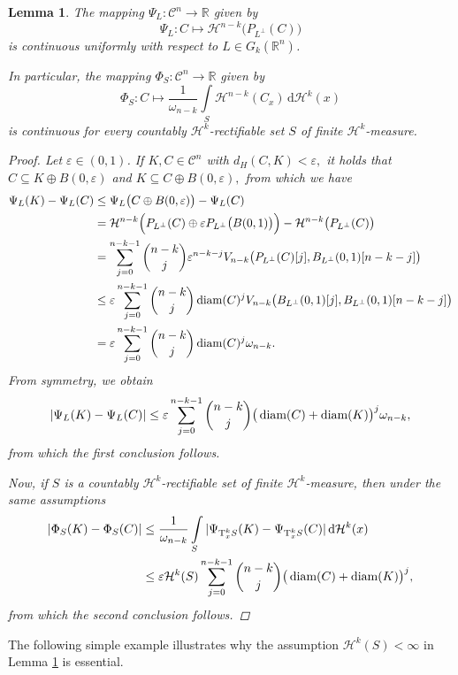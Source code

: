 \documentclass[pdflatex,sn-mathphys-num]{sn-jnl}
\theoremstyle{plain}
\newtheorem{lemma}[theorem]{Lemma}
\theoremstyle{definition}
\DeclareMathOperator{\diam}{\textup{diam}}
\newcommand{\dH}[1]{\,\mathrm d\mathcal{H}^{#1}}
\begin{document}
\begin{lemma}\label{continuity}
    The mapping $\Psi_{L}\colon \mathcal{C}^n\to\mathbb{R}$ given by $$\Psi_{L}\colon C\mapsto \mathcal{H}^{n-k}\big(P_{L^{\perp}}(C)\big)$$ is continuous uniformly with respect to $L\in G_k(\mathbb{R}^n)$. 
    
    In particular, the mapping $\Phi_S\colon \mathcal{C}^n\to\mathbb{R}$ given by $$\Phi_S\colon C\mapsto \frac{1}{\omega_{n-k}}\int\limits_{S}\mathcal{H}^{n-k}(C_x)\dH{k}(x)$$ is continuous for every countably $\mathcal{H}^k$-rectifiable set $S$ of finite $\mathcal{H}^k$-measure.
    \begin{proof}
        Let $\varepsilon\in(0, 1)$. If $K, C\in\mathcal{C}^n$ with $d_H(C, K)<\varepsilon,$ it holds that $C\subseteq K\oplus B(0, \varepsilon)$ and $K\subseteq C\oplus B(0, \varepsilon), $ from which we have \begin{equation*}
            \begin{split}
                \Psi_{L}(K)-\Psi_{L}(C)&\leq\Psi_{L}\big(C\oplus B(0, \varepsilon)\big)-\Psi_{L}(C)\\&=\mathcal{H}^{n-k}\Big(P_{L^{\perp}}(C)\oplus \varepsilon P_{L^{\perp}}\big(B(0, 1)\big)\Big)-\mathcal{H}^{n-k}\big(P_{L^{\perp}}(C)\big)\\&=\sum_{j=0}^{n-k-1}{n-k\choose j}\varepsilon^{n-k-j} V_{n-k}\big(P_{L^{\perp}}(C)[j], B_{L^{\perp}}(0, 1)[n-k-j]\big)\\&\leq\varepsilon\sum_{j=0}^{n-k-1}{n-k\choose j}\diam(C)^j V_{n-k}\big(B_{L^{\perp}}(0, 1)[j], B_{L^{\perp}}(0, 1)[n-k-j]\big)\\&=\varepsilon\sum_{j=0}^{n-k-1}{n-k\choose j}\diam(C)^j \omega_{n-k}.
            \end{split}
        \end{equation*}
        From symmetry, we obtain \begin{equation*}
            \begin{split}
                |\Psi_{L}(K)-\Psi_{L}(C)|\leq\varepsilon\sum_{j=0}^{n-k-1}{n-k\choose j}\big(\diam(C)+\diam(K)\big)^j \omega_{n-k},
            \end{split}
        \end{equation*}from which the first conclusion follows.

        Now, if $S$ is a countably $\mathcal{H}^k$-rectifiable set of finite $\mathcal{H}^k$-measure, then under the same assumptions  \begin{equation*}
            \begin{split}
                \left|\Phi_S(K)-\Phi_S(C)\right|&\leq\frac{1}{\omega_{n-k}}\int\limits_{S}|\Psi_{\textup{T}^k_xS}(K)-\Psi_{\textup{T}^k_xS}(C)|\dH{k}(x)\\&\leq \varepsilon\mathcal{H}^k(S)\sum_{j=0}^{n-k-1}{n-k\choose j}\big(\diam(C)+\diam(K)\big)^j,
            \end{split}
        \end{equation*} from which the second conclusion follows.
    \end{proof}
\end{lemma}
The following simple example illustrates why the assumption $\mathcal{H}^k(S) < \infty$ in Lemma \ref{continuity} is essential.
\end{document}
